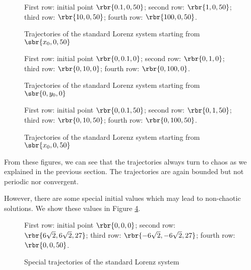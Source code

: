 \documentclass[english, nochinese]{pnote}
\begin{document}
\begin{figure}[htbp]
{
\centering
\scalebox{0.5}{}
\scalebox{0.5}{}
\scalebox{0.5}{}
\scalebox{0.5}{}
\caption{Trajectories of the standard Lorenz system starting from $ \sbr{ x_0, 0, 50 }$}
\label{Fig:Init2}
}
{
\footnotesize First row: initial point $ \rbr{ 0.1, 0, 50 } $; second row: $ \rbr{ 1, 0, 50 } $; third row: $ \rbr{ 10, 0, 50 } $; fourth row: $ \rbr{ 100, 0, 50 } $.
}
\end{figure}

\begin{figure}[htbp]
{
\centering
\scalebox{0.5}{}
\scalebox{0.5}{}
\scalebox{0.5}{}
\scalebox{0.5}{}
\caption{Trajectories of the standard Lorenz system starting from $ \sbr{ 0, y_0, 0 }$}
\label{Fig:Init3}
}
{
\footnotesize First row: initial point $ \rbr{ 0, 0.1, 0 } $; second row: $ \rbr{ 0, 1, 0 } $; third row: $ \rbr{ 0, 10, 0 } $; fourth row: $ \rbr{ 0, 100, 0 } $.
}
\end{figure}

\begin{figure}[htbp]
{
\centering
\scalebox{0.5}{}
\scalebox{0.5}{}
\scalebox{0.5}{}
\scalebox{0.5}{}
\caption{Trajectories of the standard Lorenz system starting from $ \sbr{ x_0, 0, 50 }$}
\label{Fig:Init4}
}
{
\footnotesize First row: initial point $ \rbr{ 0, 0.1, 50 } $; second row: $ \rbr{ 0, 1, 50 } $; third row: $ \rbr{ 0, 10, 50 } $; fourth row: $ \rbr{ 0, 100, 50 } $.
}
\end{figure}

From these figures, we can see that the trajectories always turn to chaos as we explained in the previous section. The trajectories are again bounded but not periodic nor convergent.

However, there are some special initial values which may lead to non-chaotic solutions. We show these values in Figure \ref{Fig:InitSpec}.

\begin{figure}[htbp]
{
\centering
\scalebox{0.5}{}
\scalebox{0.5}{}
\scalebox{0.5}{}
\scalebox{0.5}{}
\caption{Special trajectories of the standard Lorenz system}
\label{Fig:InitSpec}
}
{
\footnotesize First row: initial point $ \rbr{ 0, 0, 0 } $; second row: $ \rbr{ 6 \sqrt{2}, 6 \sqrt{2}, 27 } $; third row: $ \rbr{ -6 \sqrt{2}, -6 \sqrt{2}, 27 } $; fourth row: $ \rbr{ 0, 0, 50 } $.
}
\end{figure}
\end{document}
